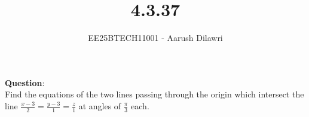 \documentclass[journal]{IEEEtran}
\begin{document}

\vspace{3cm}

\title{4.3.37}
\author{EE25BTECH11001 - Aarush Dilawri}
\maketitle
{\let\newpage\relax\maketitle}

\renewcommand{\thefigure}{\theenumi}
\renewcommand{\thetable}{\theenumi}
\setlength{\intextsep}{10pt} %


\renewcommand{\thetable}{\theenumi}

\textbf{Question}:\\
Find the equations of the two lines passing through the origin which intersect the line $\frac{x-3}{2} = \frac{y-3}{1} = \frac{z}{1}$ at angles of $\frac{\pi}{3}$ each.
\end{document}
